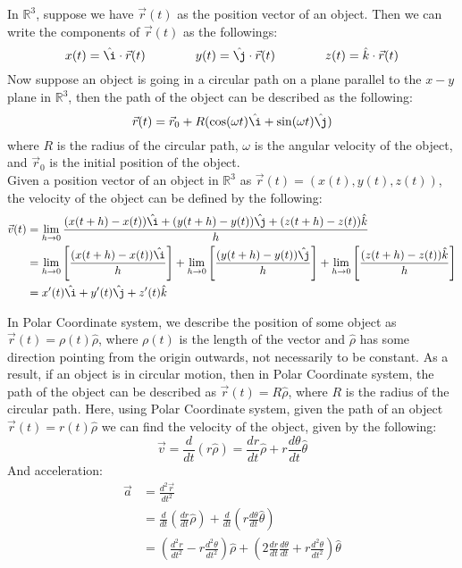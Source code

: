 \documentclass[11pt]{article}
\theoremstyle{break}
\theoremstyle{break}
\newcommand{\R}{\mathbb{R}}
\begin{document}
In $\R^3$, suppose we have $\vec{r}(t)$ as the position vector of an object. Then we can write the components of $\vec{r}(t)$ as the followings:
$$x(t) = \hat{\i}\cdot \vec{r}(t)\qquad\qquad  y(t) = \hat{\j}\cdot \vec{r}(t)\qquad\qquad z(t) = \hat{k}\cdot \vec{r}(t)$$
Now suppose an object is going in a circular path on a plane parallel to the $x-y$ plane in $\R^3$, then the path of the object can be described as the following:
$$\vec{r}(t) = \vec{r}_0 + R(\cos(\omega t)\hat{\i} + \sin(\omega t)\hat{\j}) $$
where $R$ is the radius of the circular path, $\omega$ is the angular velocity of the object, and $\vec{r}_0$ is the initial position of the object.\\

Given a position vector of an object in $\R^3$ as $\vec{r}(t) = (x(t),y(t),z(t))$, the velocity of the object can be defined by the following:
\begin{align*}
\vec{v}(t) &= \lim_{h \to 0}\frac{(x(t+h)-x(t))\hat{\i}+(y(t+h)-y(t))\hat{\j}+(z(t+h)-z(t))\hat{k}}{h}\\
&= \lim_{h\to 0}\left[\frac{(x(t+h)-x(t))\hat{\i}}{h}\right] +\lim_{h\to 0}\left[\frac{(y(t+h)-y(t))\hat{\j}}{h}\right] + \lim_{h\to 0}\left[\frac{(z(t+h)-z(t))\hat{k}}{h}\right] \\
&= x'(t)\hat{\i}+y'(t)\hat{\j}+z'(t)\hat{k}
\end{align*}


In Polar Coordinate system, we describe the position of some object as $\vec{r}(t) = \rho (t) \hat{\rho}$, where $\rho(t)$ is the length of the vector and $\hat{\rho}$ has some direction pointing from the origin outwards, not necessarily to be constant. As a result, if an object is in circular motion, then in Polar Coordinate system, the path of the object can be described as $\vec{r}(t) = R \hat{\rho}$, where $R$ is the radius of the circular path. Here, using Polar Coordinate system, given the path of an object $\vec{r}(t) = r(t)\hat{\rho}$ we can find the velocity of the object, given by the following:
$$\vec{v} = \frac{d}{dt}(r\hat{\rho}) = \frac{dr}{dt}\hat{\rho} + r\frac{d\theta}{dt}\hat{\theta}$$
And acceleration: 
\begin{align*}
\vec{a} &= \frac{d^2\vec{r}}{dt^2}\\
&=\frac{d}{dt}\left(\frac{dr}{dt}\hat{\rho}\right)+\frac{d}{dt}\left(r\frac{d\theta}{dt}\hat{\theta}\right)\\
&= \left(\frac{d^2r}{dt^2}-r\frac{d^2\theta}{dt^2}\right)\hat{\rho} + \left(2\frac{dr}{dt}\frac{d\theta}{dt}+r\frac{d^2\theta}{dt^2}\right)\hat{\theta}
\end{align*}
\end{document}
